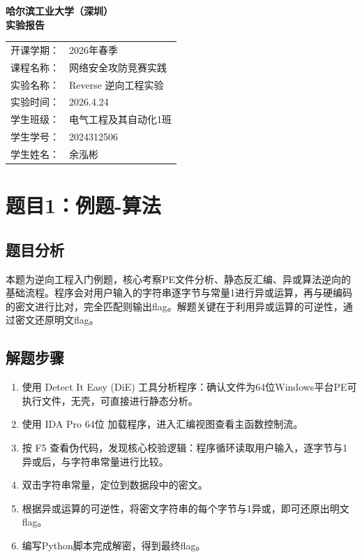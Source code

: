 \documentclass[12pt,a4paper,UTF8]{ctexart}
\begin{document}
\begin{center}
    \Huge \textbf{哈尔滨工业大学（深圳）} \\
    \vspace{1cm}
    \Huge \textbf{实验报告}
\end{center}

\vspace{1.5cm}

\begin{tabular}{ll}
    开课学期： & 2026年春季 \\
    课程名称： & 网络安全攻防竞赛实践 \\
    实验名称： & Reverse 逆向工程实验 \\
    实验时间： & 2026.4.24 \\
    学生班级： & 电气工程及其自动化1班 \\
    学生学号： & 2024312506 \\
    学生姓名： & 余泓彬 \\
\end{tabular}

\newpage

\section{题目1：例题-算法}
\subsection{题目分析}
本题为逆向工程入门例题，核心考察PE文件分析、静态反汇编、异或算法逆向的基础流程。程序会对用户输入的字符串逐字节与常量1进行异或运算，再与硬编码的密文进行比对，完全匹配则输出flag。解题关键在于利用异或运算的可逆性，通过密文还原明文flag。

\subsection{解题步骤}
\begin{enumerate}
    \item 使用 Detect It Easy (DiE) 工具分析程序：确认文件为64位Windows平台PE可执行文件，无壳，可直接进行静态分析。
    \item 使用 IDA Pro 64位 加载程序，进入汇编视图查看主函数控制流。
    \item 按 F5 查看伪代码，发现核心校验逻辑：程序循环读取用户输入，逐字节与1异或后，与字符串常量进行比较。
    \item 双击字符串常量，定位到数据段中的密文。
    \item 根据异或运算的可逆性，将密文字符串的每个字节与1异或，即可还原出明文flag。
    \item 编写Python脚本完成解密，得到最终flag。
\end{enumerate}
\end{document}
